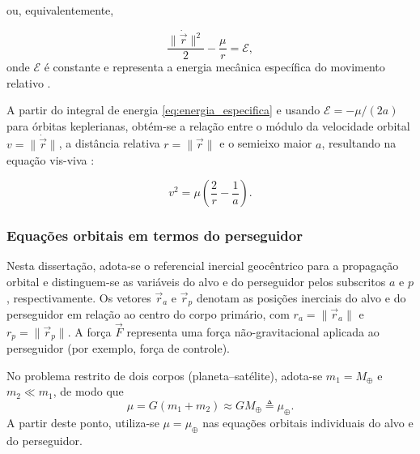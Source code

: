 ou, equivalentemente,

\begin{equation}
\frac{\|\dot{\vec r}\|^2}{2}-\frac{\mu}{r}=\mathcal{E},
\label{eq:energia_especifica}
\end{equation}
onde $\mathcal{E}$ é constante e representa a energia mecânica específica do movimento relativo \cite{wie2008space}.


A partir do integral de energia \eqref{eq:energia_especifica} e usando $\mathcal{E}=-\mu/(2a)$ para órbitas keplerianas, obtém-se a relação entre o módulo da velocidade orbital $v=\|\dot{\vec r}\|$, a distância relativa $r=\|\vec r\|$ e o semieixo maior $a$, resultando na equação vis-viva \cite{wie2008space}:

\begin{equation}
\label{eq:vis_viva}
v^2 = \mu\left(\frac{2}{r}-\frac{1}{a}\right).
\end{equation}

\subsubsection{Equações orbitais em termos do perseguidor}

Nesta dissertação, adota-se o referencial inercial geocêntrico para a propagação orbital e distinguem-se as variáveis do alvo e do perseguidor pelos subscritos $a$ e $p$, respectivamente.
Os vetores $\vec r_a$ e $\vec r_p$ denotam as posições inerciais do alvo e do perseguidor em relação ao centro do corpo primário, com $r_a=\|\vec r_a\|$ e $r_p=\|\vec r_p\|$.
A força $\vec F$ representa uma força não-gravitacional aplicada ao perseguidor (por exemplo, força de controle).


No problema restrito de dois corpos (planeta--satélite), adota-se $m_1=M_\oplus$ e $m_2\ll m_1$, de modo que
\begin{equation}
\mu = G(m_1+m_2)\approx GM_\oplus \triangleq \mu_\oplus.
\end{equation}
A partir deste ponto, utiliza-se $\mu=\mu_\oplus$ nas equações orbitais individuais do alvo e do perseguidor.




